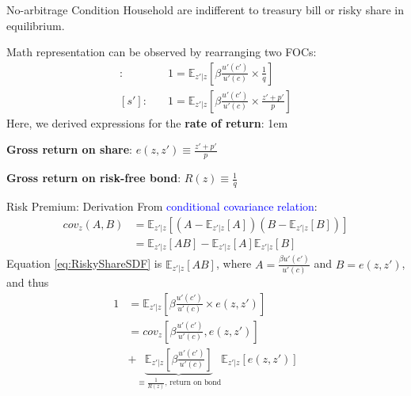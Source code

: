 \documentclass[handout, 11pt,aspectratio=43,usenames,dvipsnames]{beamer}
\newcommand{\blue}[1]{\textcolor{blue}{#1}}
\let\olditemize=\itemize
\let\endolditemize=\enditemize
\renewenvironment{itemize}{\olditemize \itemsep1em}{\endolditemize}
\theoremstyle{definition}
\begin{document}
\begin{frame}{No-arbitrage Condition}
\label{slide:No_arbitrage_Condition}
    Household are indifferent to treasury bill or risky share in equilibrium.

    Math representation can be observed by rearranging two FOCs:
    \begin{align}
        [a']: \quad
            & 1 = \mathbb{E}_{z'|z} \left[
                \beta \frac{u'(c')}{u'(c)} \times  \frac{1}{q}
            \right]
        \\
        \label{eq:RiskyShareSDF}
        [s']: \quad
            & 1 = \mathbb{E}_{z'|z} \left[
                \beta \frac{u'(c')}{u'(c)} \times \frac{z' +p'}{p}
            \right]
    \end{align}
    Here, we derived expressions for the \textbf{rate of return}:
    \begin{itemize}
        \item \textbf{Gross return on share}: $e(z, z') \equiv  \frac{z' +p'}{p}$
        \item \textbf{Gross return on risk-free bond}: $R(z) \equiv  \frac{1}{q} $
    \end{itemize}

\end{frame}

\begin{frame}{Risk Premium: Derivation}
\label{slide:Risk_Premium__Derivation}
    From \blue{conditional covariance relation}:
    \begin{align}
        cov_{z}(A, B)
            & = \mathbb{E}_{z'|z} \left[
                \left(
                    A - \mathbb{E}_{z'|z}[A]
                \right)
                \left(
                    B - \mathbb{E}_{z'|z}[B]
                \right)
            \right]
        \\
            & = \mathbb{E}_{z'|z}\left[
                AB
            \right]
                -
                \mathbb{E}_{z'|z}[A] \mathbb{E}_{z'|z}[B]
    \end{align}
    Equation \eqref{eq:RiskyShareSDF} is $
        \mathbb{E}_{z'|z}\left[
                        AB
                    \right]
    $, where $ A = \frac{\beta u'(c')}{u'(c)} $ and $ B = e(z, z') $, and thus
    \begin{align}
        1
            & = \mathbb{E}_{z'|z} \left[
            \beta \frac{u'(c')}{u'(c)} \times e(z, z')
            \right]
        \\
            & =
        cov_{z}\left[
            \beta \frac{u'(c')}{u'(c)}, e(z, z')
        \right]
        \\
            &
        +
        \underbrace{
        \mathbb{E}_{z'|z}\left[
            \beta \frac{u'(c')}{u'(c)}
        \right]
        }_{\equiv \frac{1}{R(z)} \text{, return on bond}}
        \mathbb{E}_{z'|z} \left[
            e(z, z')
        \right]
    \end{align}
\end{frame}
\end{document}
